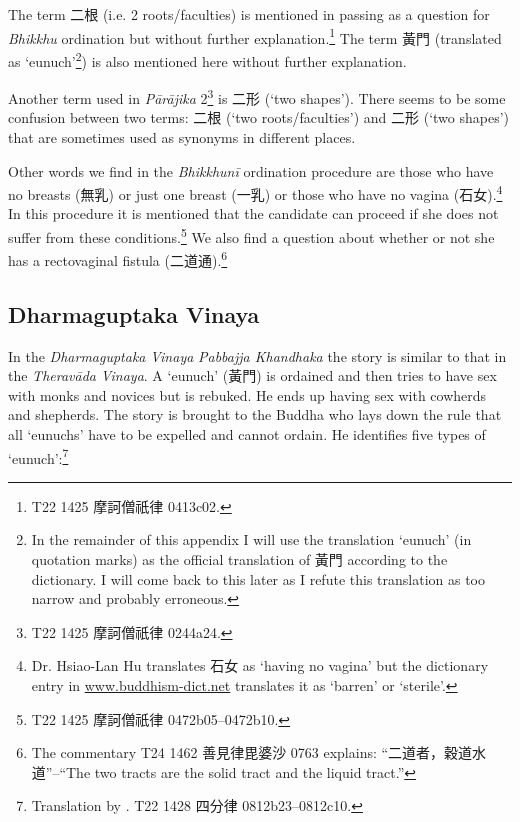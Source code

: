 The term 二根 (i.e. 2 roots/faculties) is mentioned in passing as a question for {\em Bhikkhu} ordination but without further explanation.\footnote{T22 1425 摩訶僧祇律 0413c02.} The term 黃門 (translated as `eunuch'\footnote{In the remainder of this appendix I will use the translation `eunuch' (in quotation marks) as the official translation of 黃門 according to the dictionary. I will come back to this later as I refute this translation as too narrow and probably erroneous.}) is also mentioned here without further explanation.

Another term used in {\em Pārājika} 2\footnote{T22 1425 摩訶僧祇律 0244a24.} is 二形 (`two shapes'). There seems to be some confusion between two terms: 二根 (`two roots/faculties') and 二形 (`two shapes') that are sometimes used as synonyms in different places.

Other words we find in the {\em Bhikkhunī} ordination procedure are those who have no breasts (無乳) or just one breast (一乳) or those who have no vagina (石女).\footnote{Dr. Hsiao-Lan Hu translates 石女 as `having no vagina' but the dictionary entry in \href{http://www.buddhism-dict.net/cgi-bin/xpr-ddb.pl?q=石女}{www.buddhism-dict.net} translates it as `barren' or `sterile'.} In this procedure it is mentioned that the candidate can proceed if she does not suffer from these conditions.\footnote{T22 1425 摩訶僧祇律 0472b05–0472b10.} We also find a question about whether or not she has a rectovaginal fistula (二道通).\footnote{The commentary T24 1462 善見律毘婆沙 0763 explains: ``二道者，穀道水道''--``The two tracts are the solid tract and the liquid tract.''}

\subsection{Dharmaguptaka Vinaya}
In the {\em Dharmaguptaka} {\em Vinaya} {\em Pabbajja Khandhaka} the story is similar to that in the {\em Theravāda} {\em Vinaya}. A `eunuch' (黃門) is ordained and then tries to have sex with monks and novices but is rebuked. He ends up having sex with cowherds and shepherds. The story is brought to the Buddha who lays down the rule that all `eunuchs' have to be expelled and cannot ordain. He identifies five types of `eunuch':\footnote{Translation by \cite{bodhi}. T22 1428 四分律 0812b23–0812c10.} 

